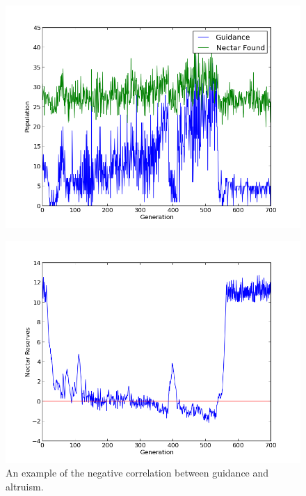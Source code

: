 \documentclass[11pt]{article}
\begin{document}
			\begin{figure}[tbph!]
				\begin{center}
					\includegraphics[scale=.5]{results/gossip_plot_twist_tell.png}
				\end{center}
                \caption{}
				\label{fig:gossip_guidance}
			\end{figure}

                        \begin{figure}[tbph!]
				\begin{center}
					\includegraphics[scale=.5]{results/gossip_plot_twist_res.png}
				\end{center}
				\caption{An example of the negative correlation between guidance and altruism.}
				\label{fig:gossip_reserves}
			\end{figure}
\end{document}
